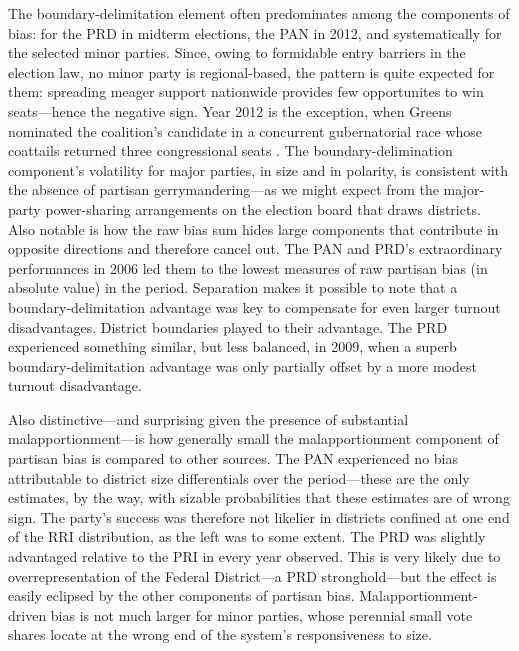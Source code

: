 \documentclass[letter,12pt]{article}
\begin{document}
The boundary-delimitation element often predominates among the components of bias: for the PRD in midterm elections, the PAN in 2012, and systematically for the selected minor parties. Since, owing to formidable entry barriers in the election law, no minor party is regional-based, the pattern is quite expected for them: spreading meager support nationwide provides few opportunites to win seats---hence the negative sign. Year 2012 is the exception, when Greens nominated the coalition's candidate in a concurrent gubernatorial race whose coattails returned three congressional seats \citep{magar.gubCoatMx.2012}. The boundary-delimination component's volatility for major parties, in size and in polarity, is consistent with the absence of partisan gerrymandering---as we might expect from the major-party power-sharing arrangements on the election board that draws districts. Also notable is how the raw bias sum hides large components that contribute in opposite directions and therefore cancel out. The PAN and PRD's extraordinary performances in 2006 led them to the lowest measures of raw partisan bias (in absolute value) in the period. Separation makes it possible to note that a boundary-delimitation advantage was key to compensate for even larger turnout disadvantages. District boundaries played to their advantage. The PRD experienced something similar, but less balanced, in 2009, when a superb boundary-delimitation advantage was only partially offset by a more modest turnout disadvantage. 

Also distinctive---and surprising given the presence of substantial malapportionment---is how generally small the malapportionment component of partisan bias is compared to other sources. The PAN experienced no bias attributable to district size differentials over the period---these are the only estimates, by the way, with sizable probabilities that these estimates are of wrong sign. The party's success was therefore not likelier in districts confined at one end of the RRI distribution, as the left was to some extent. The PRD was slightly advantaged relative to the PRI in every year observed. This is very likely due to overrepresentation of the Federal District---a PRD stronghold---but the effect is easily eclipsed by the other components of partisan bias. \citep[The drop from +.14 to +.05 between 2003 and 2006 actually coincides with reapportionment and the accessory reduction---not removal---of the capital's overrepresentation in Congress, see][.]{altman.magar.mcd.trelles2014apsa} Malapportionment-driven bias is not much larger for minor parties, whose perennial small vote shares locate at the wrong end of the system's responsiveness to size. 
\end{document}
